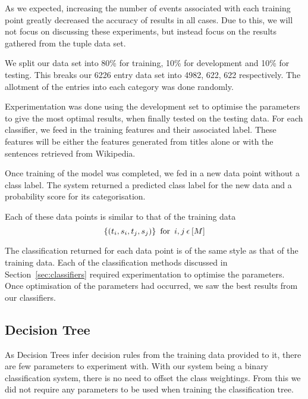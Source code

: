 \documentclass[bsc,frontabs,twoside,singlespacing,parskip,deptreport]{infthesis}     %
\begin{document}
As we expected, increasing the number of events associated with each training point greatly decreased the accuracy of results in all cases.
Due to this, we will not focus on discussing these experiments, but instead focus on the results gathered from the tuple data set.

We split our data set into 80\% for training, 10\% for development and 10\% for testing.
This breaks our 6226 entry data set into 4982, 622, 622 respectively.
The allotment of the entries into each category was done randomly.

Experimentation was done using the development set to optimise the parameters to give the most optimal results,
when finally tested on the testing data.
For each classifier, we feed in the training features and their associated label. These features will
be either the features generated from titles alone or with the sentences retrieved from Wikipedia.

Once training of the model was completed, we fed in a new data point without a class label.
The system returned a predicted class label for the new data and a probability score for its categorisation.

Each of these data points is similar to that of the training data
 \begin{equation}
   \{(t_{i},s_{i},t_{j},s_{j})\} \hspace{0.5em} \text{for} \hspace{0.5em} i,j \hspace{0.2em}\epsilon \hspace{0.2em}[M]\nonumber
 \end{equation}

 The classification returned for each data point is of the same style as that of the training data.
 Each of the classification methods discussed in Section~\ref{sec:classifiers} required experimentation to optimise the
 parameters. Once optimisation of the parameters had occurred, we saw the best results from our classifiers.

 \subsection{Decision Tree}
 As Decision Trees infer decision rules from the training data provided to it, there are few parameters to
 experiment with. With our system being a binary classification system, there is no need to offset the class weightings.
 From this we did not require any parameters to be used when training the classification tree.
 
\end{document}
